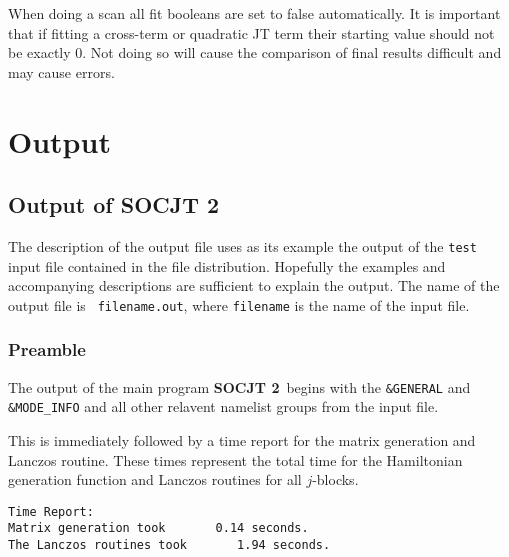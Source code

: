 \documentclass{article}
\newcommand{\JT}{Jahn-Teller\ }
\newcommand{\socjttwo}{{\bf SOCJT 2}}
\begin{document}
When doing a scan all fit booleans are set to false automatically. It is important
that if fitting a cross-term or quadratic JT term their starting value should not
be exactly 0. Not doing so will cause the comparison of final results difficult and may
cause errors.

\section{Output} \label{section:output}

\subsection{Output of \socjttwo }

The description of the output file uses as its example the output of
the {\tt test} input file contained in the file
distribution. Hopefully the examples and accompanying descriptions are
sufficient to explain the output. The name of the output file is {\tt
  filename.out}, where {\tt filename} is the name of the input file.

\subsubsection{Preamble}

The output of the main program \socjttwo\ begins with the {\tt \&GENERAL} and {\tt \&MODE\_INFO} and all other relavent namelist groups
from the input file. 

This is immediately followed by a time report for the matrix generation and Lanczos routine. These times represent the total time for the Hamiltonian generation function and Lanczos routines for all $j$-blocks.

\begin{verbatim}
Time Report:
Matrix generation took       0.14 seconds.
The Lanczos routines took       1.94 seconds.
\end{verbatim}


\end{document}
